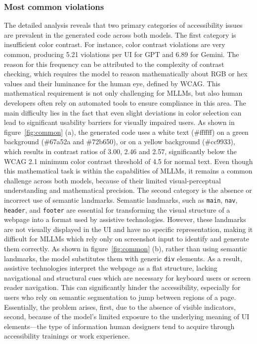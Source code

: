 \subsubsection{Most common violations}
The detailed analysis reveals that two primary categories of accessibility
issues are prevalent in the generated code across both models.
The first category is insufficient color contrast. For instance,
color contrast violations are very common, producing 5.21 violations 
per UI for GPT and 6.89 for Gemini. The reason for this frequency 
can be attributed to the complexity of contrast checking, which 
requires the model to reason mathematically about RGB or hex values
and their luminance for the human eye, defined by WCAG. This mathematical 
requirement is not only challenging for MLLMs, but also human 
developers often rely on automated tools to ensure compliance 
in this area. The main difficulty lies in the fact that 
even slight deviations in color selection can lead to significant 
usability barriers for visually impaired users. As shown in 
figure~\ref{fig:common} (a), the generated code uses a white text 
(\#ffffff) on a green background (\#67a52a and \#72b650), 
or on a yellow background (\#cc9933), which results in 
contrast ratios of 3.00, 2.46 and 2.57, significantly below the
WCAG 2.1 minimum color contrast threshold of 4.5 for normal text.
Even though this mathematical task is within the capabilities of 
MLLMs, it remains a common challenge across both models, because 
of their limited visual-perceptual understanding and mathematical 
precision.\newline
The second category is the absence or incorrect use of semantic 
landmarks. Semantic landmarks, such as \texttt{main}, \texttt{nav},
\texttt{header}, and \texttt{footer} are essential for transforming 
the visual structure of a webpage into a format used by
assistive technologies. However, these landmarks are not visually 
displayed in the UI and have no specific representation, making it 
difficult for MLLMs which rely only on screenshot input
to identify and generate them correctly. As 
shown in figure~\ref{fig:common} (b), rather than using 
semantic landmarks, the model substitutes them with 
generic \texttt{div} elements. As a result, assistive technologies 
interpret the webpage as a flat structure, lacking navigational 
and structural cues which are necessary for keyboard users or 
screen reader navigation. This can significantly hinder 
the accessibility, especially for users who rely on 
semantic segmentation to jump between regions of a page. 
Essentially, the problem arises, first, due to the absence 
of visible indicators, second, because of the model’s 
limited exposure to the underlying meaning of UI 
elements—the type of information human designers tend 
to acquire through accessibility trainings or work experience.



